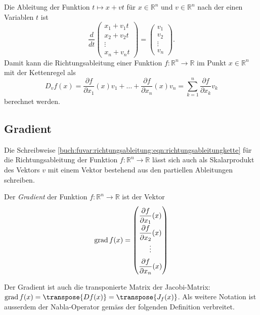 Die Ableitung der Funktion $t\mapsto x+vt$ für $x\in\mathbb{R}^n$
und $v\in\mathbb{R}^n$ nach der einen Variablen $t$ ist
\[
\frac{d}{dt}
\begin{pmatrix}
x_1+v_1t\\
x_2+v_2t\\
\vdots  \\
x_n+v_nt
\end{pmatrix}
=
\begin{pmatrix}
v_1\\
v_2\\
\vdots\\
v_n
\end{pmatrix}.
\]
Damit kann die Richtungsableitung einer Funktion
$f\colon\mathbb{R}^n\to\mathbb{R}$
im Punkt $x\in\mathbb{R}^n$ mit der Kettenregel als
\begin{equation}
D_vf(x)
=
\frac{\partial f}{\partial x_1}(x) v_1
+
\dots
+
\frac{\partial f}{\partial x_n}(x) v_n
=
\sum_{k=1}^n \frac{\partial f}{\partial x_k} v_k
\label{buch:fuvar:richtungsableitung:eqn:richtungsableitungkette}
\end{equation}
berechnet werden.

%
%
\subsection{Gradient}
Die Schreibweise
\eqref{buch:fuvar:richtungsableitung:eqn:richtungsableitungkette}
für die Richtungsableitung der Funktion $f\colon\mathbb{R}^n\to\mathbb{R}$
lässt sich auch als Skalarprodukt des Vektors $v$ mit einem Vektor
bestehend aus den partiellen Ableitungen schreiben.

\begin{definition}
\label{buch:fuvar:richtungsableitung:def:gradient}
Der {\em Gradient} der Funktion $f\colon\mathbb{R}^n\to\mathbb{R}$ ist der
Vektor
\[
\operatorname{grad}f(x)
=
{
\renewcommand{\arraystretch}{1.9}
\begin{pmatrix}
\displaystyle
\frac{\partial f}{\partial x_1}(x)\\
\displaystyle
\frac{\partial f}{\partial x_2}(x)\\
\vdots \\
\displaystyle
\frac{\partial f}{\partial x_n}(x)
\end{pmatrix}
}
\]
\end{definition}

Der Gradient ist auch die transponierte Matrix der Jacobi-Matrix:
$\operatorname{grad}f(x) = \transpose{Df(x)} = \transpose{J_f(x)}$.
Als weitere Notation ist ausserdem der Nabla-Operator gemäss der folgenden
Definition verbreitet.

